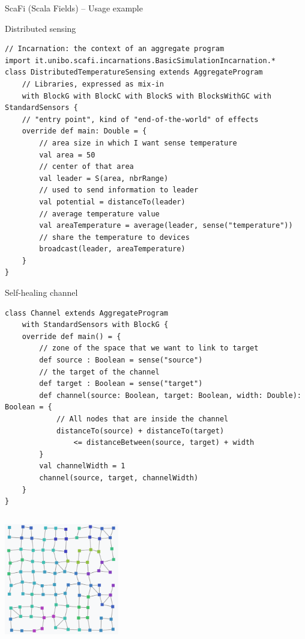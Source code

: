 \documentclass[presentation, 9pt]{beamer}\mode<presentation>{\usetheme{AMSBolognaFC}}
\begin{document}
\begin{frame}{ScaFi (Scala Fields) -- Usage example \href{https://github.com/cric96/spark-mini-example}{\faLink}}
	\begin{alertblock}{Distributed sensing}
		\begin{tcolorbox}[left=0pt, top=0pt, bottom=0pt]
			\begin{verbatim}
// Incarnation: the context of an aggregate program
import it.unibo.scafi.incarnations.BasicSimulationIncarnation.*
class DistributedTemperatureSensing extends AggregateProgram
	// Libraries, expressed as mix-in
	with BlockG with BlockC with BlockS with BlocksWithGC with StandardSensors { 
	// "entry point", kind of "end-of-the-world" of effects
	override def main: Double = {
		// area size in which I want sense temperature
		val area = 50 
		// center of that area
		val leader = S(area, nbrRange) 
		// used to send information to leader
		val potential = distanceTo(leader)
		// average temperature value
		val areaTemperature = average(leader, sense("temperature")) 
		// share the temperature to devices
		broadcast(leader, areaTemperature)
	}
}
			\end{verbatim}
		\end{tcolorbox}
	\end{alertblock}
\centering
	\begin{alertblock}{Self-healing channel}
		\begin{tcolorbox}[left=0pt, top=0pt, bottom=0pt]
			\begin{verbatim}
class Channel extends AggregateProgram 
	with StandardSensors with BlockG {
	override def main() = {
		// zone of the space that we want to link to target
		def source : Boolean = sense("source")
		// the target of the channel
		def target : Boolean = sense("target") 
		def channel(source: Boolean, target: Boolean, width: Double): Boolean = {
			// All nodes that are inside the channel
			distanceTo(source) + distanceTo(target) 
				<= distanceBetween(source, target) + width
		}
		val channelWidth = 1
		channel(source, target, channelWidth)
	}
}
			\end{verbatim}
		\end{tcolorbox}
	\end{alertblock}
\framebreak
\begin{columns}
	\begin{column}[c]{0.4\textwidth}
		\includegraphics[width=5cm]{img/temperature.png}

\end{column}
\end{columns}
\end{frame}
\end{document}
